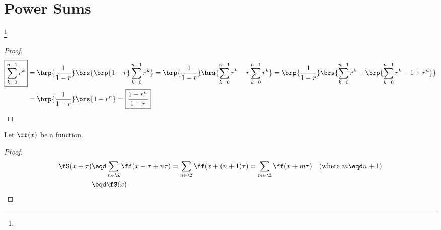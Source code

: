 \section{Power Sums}
\begin{theorem}
\footnote{
  }
\label{thm:series_geometric}
\end{theorem}
\begin{proof}
\begin{align*}
  \boxed{\sum_{k=0}^{n-1} r^k}
    &= \brp{\frac{1}{1-r}}\brs{\brp{1-r}\sum_{k=0}^{n-1} r^k}
     = \brp{\frac{1}{1-r}}\brs{\sum_{k=0}^{n-1} r^k - r\sum_{k=0}^{n-1} r^k}
     = \brp{\frac{1}{1-r}}\brs{\sum_{k=0}^{n-1} r^k - \brp{\sum_{k=0}^{n-1} r^k -1 + r^n}}
  \\&= \brp{\frac{1}{1-r}}\brs{1 - r^n}
     = \boxed{\frac{1-r^n}{1-r}}
\end{align*}
\end{proof}

\begin{lemma}
\label{lem:series_sumT}
Let $\ff(x)$ be a function.
\end{lemma}
\begin{proof}
\begin{align*}
  \fS(x+\tau)
    &\eqd \sum_{n\in\Z} \ff(x+\tau+n\tau)
     =    \sum_{n\in\Z} \ff(x+(n+1)\tau)
     =    \sum_{m\in\Z} \ff(x+m\tau)
     \quad\text{(where $m\eqd n+1$)}
  \\&\eqd \fS(x)
\end{align*}
\end{proof}

